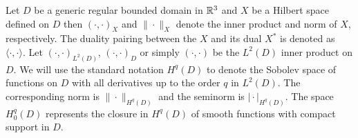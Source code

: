 \documentclass[r]{siamart171218}
\begin{document}




Let $D$ be a generic regular bounded domain in $\mathbb{R}^3$
and $X$ be a Hilbert space defined on $D$ then  $(\cdot,\cdot)_X$ and $\|\cdot\|_X$ denote the inner product and norm of $X$, respectively.
The duality pairing between the $X$ and its dual $X^*$ is denoted as $\langle\cdot,\cdot\rangle$.
Let $(\cdot,\cdot)_{L^2(D)}$,  $(\cdot,\cdot)_D$ or simply $(\cdot,\cdot)$ be the $L^2(D)$ inner product on $D$.
We will use the standard notation $H^q(D)$ to denote the Sobolev space of functions on $D$ with all derivatives up to the order $q$ in $L^2(D)$.
The corresponding norm is $\|\cdot\|_{H^q(D)}$ and the seminorm is $\vert\cdot\vert_{H^q(D)}$.
The space $H^q_0(D)$ represents the closure in $H^q(D)$ of smooth functions with compact support in $D$.
\end{document}

